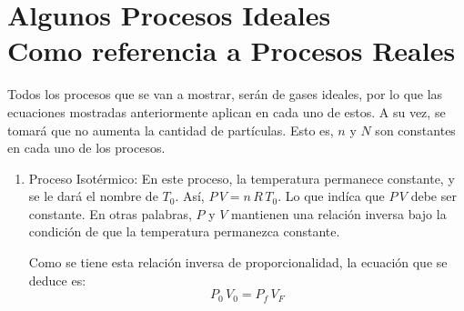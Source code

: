 \section[Algunos Procesos Ideales como referencia a Procesos Reales]{
Algunos Procesos Ideales\\
Como referencia a Procesos Reales}

Todos los procesos que se van a mostrar, serán de gases ideales, por lo
que las ecuaciones mostradas anteriormente aplican en cada uno de estos.
A su vez, se tomará que no aumenta la cantidad de partículas. Esto es,
$n$ y $N$ son constantes en cada uno de los procesos.

\begin{enumerate}
  \item Proceso Isotérmico:
        En este proceso, la temperatura permanece constante, y se le
        dará el nombre de $T_0$. Así, $P\,V = n\,R\,T_0$. Lo que indíca
        que $P\,V$ debe ser constante. En otras palabras, $P$ y $V$
        mantienen una relación inversa bajo la condición de que la
        temperatura permanezca constante.

        \begin{center}
        \end{center}

        Como se tiene esta relación inversa de proporcionalidad,
        la ecuación que se deduce es:
        \[P_0\,V_0 = P_f\,V_F\]


\end{enumerate}

